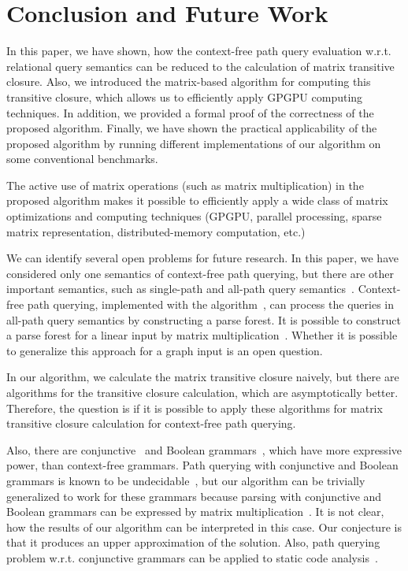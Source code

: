 \section{Conclusion and Future Work}
\label{section_conclusion}

In this paper, we have shown, how the context-free path query evaluation w.r.t. relational query semantics can be reduced to the calculation of matrix transitive closure. Also, we introduced the matrix-based algorithm for computing this transitive closure, which allows us to efficiently apply GPGPU computing techniques. In addition, we provided a formal proof of the correctness of the proposed algorithm. Finally, we have shown the practical applicability of the proposed algorithm by running different implementations of our algorithm on some conventional benchmarks.

The active use of matrix operations (such as matrix multiplication) in the proposed algorithm makes it possible to efficiently apply a wide class of matrix optimizations and computing techniques (GPGPU, parallel processing, sparse matrix representation, distributed-memory computation, etc.)

We can identify several open problems for future research. In this paper, we have considered only one semantics of context-free path querying, but there are other important semantics, such as single-path and all-path query semantics~\cite{hellingsPathQuerying}. Context-free path querying, implemented with the algorithm~\cite{GLL}, can process the queries in all-path query semantics by constructing a parse forest. It is possible to construct a parse forest for a linear input by matrix multiplication~\cite{okhotin_cyk}. Whether it is possible to generalize this approach for a graph input is an open question.

In our algorithm, we calculate the matrix transitive closure naively, but there are algorithms for the transitive closure calculation, which are asymptotically better. Therefore, the question is if it is possible to apply these algorithms for matrix transitive closure calculation for context-free path querying.

Also, there are conjunctive~\cite{okhotinConjAndBool} and Boolean grammars~\cite{okhotinBoolean}, which have more expressive power, than context-free grammars. Path querying with conjunctive and Boolean grammars is known to be undecidable~\cite{hellingsRelational}, but our algorithm can be trivially generalized to work for these grammars because parsing with conjunctive and Boolean grammars can be expressed by matrix multiplication~\cite{okhotin_cyk}. It is not clear, how the results of our algorithm can be interpreted in this case. Our conjecture is that it produces an upper approximation of the solution. Also, path querying problem w.r.t. conjunctive grammars can be applied to static code analysis~\cite{zhang2017context}.

\FloatBarrier
